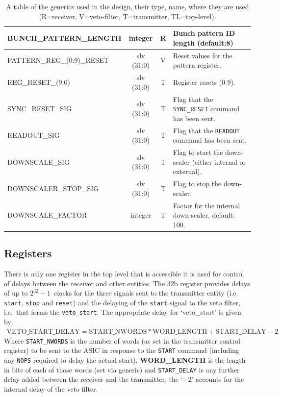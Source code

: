 \begin{table}
\begin{center}
\begin{tabulary}{\textwidth}{l| c | c | L}
      BUNCH\_PATTERN\_LENGTH     & integer    &  R              & Bunch pattern ID length (default:8) \\
      \hline                                                    
      PATTERN\_REG\_(0:9)\_RESET & slv (31:0) &  V              & Reset values for the pattern register.\\
      \hline                                                    
      REG\_RESET\_(9:0)          & slv (31:0) &  T              & Register resets (0-9). \\
      SYNC\_RESET\_SIG           & slv (31:0) &  T              & Flag that the \texttt{SYNC\_RESET} command has been sent.   \\
      READOUT\_SIG               & slv (31:0) &  T              & Flag that the \texttt{READOUT} command has been sent.       \\
      DOWNSCALE\_SIG             & slv (31:0) &  T              & Flag to start the down-scaler (either internal or external).\\
      DOWNSCALER\_STOP\_SIG      & slv (31:0) &  T              & Flag to stop the down-scaler.                               \\
      DOWNSCALE\_FACTOR          & integer    &  T              & Factor for the internal down-scaler, default: 100.          \\
    \end{tabulary}
  \end{center}
  \caption{A table of the generics used in the design, their type, name, where they are used (R=receiver, V=veto-filter, T=transmitter, TL=top-level).}
  \label{tab:all_generics}
\end{table}

\subsection{Registers} %
\label{sub:top_registers}
There is only one register in the top level that is accessible it is used for control of delays between the receiver and other entities. The 32b register provides delays of up to \( 2^{32} - 1 \)~clocks for the three signals sent to the transmitter entity (i.e. \texttt{start}, \texttt{stop} and \texttt{reset}) and the delaying of the \texttt{start} signal to the veto filter, i.e.\ that forms the \texttt{veto\_start}. The appropriate delay for `veto\_start' is given by:
\begin{align}\label{equ:veto_start_delay}
  \text{VETO\_START\_DELAY} = \text{START\_NWORDS} * \text{WORD\_LENGTH} + \text{START\_DELAY} - 2 
\end{align}
Where \texttt{START\_NWORDS} is the number of words (as set in the transmitter control register) to be sent to the ASIC in response to the \texttt{START} command (including any \texttt{NOPS} required to delay the actual start), \textbf{WORD\_LENGTH} is the length in bits of each of those words (set via generic) and \texttt{START\_DELAY} is any further delay added between the receiver and the transmitter, the `\(- 2\)' accounts for the internal delay of the veto filter. 
    

